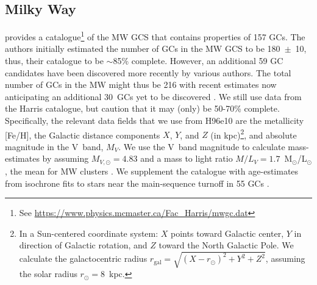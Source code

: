\documentclass[a4paper,fleqn,usenatbib]{mnras}
\begin{document}
\subsection{Milky Way}
\label{sec:milkyway}
\citet[][2010 edition; hereafter H96e10]{1996AJ....112.1487H} provides a
catalogue\footnote{See \url{https://www.physics.mcmaster.ca/Fac_Harris/mwgc.dat}}
of the MW GCS that contains properties of 157 GCs. 
The authors initially estimated the number of GCs in the MW GCS to be 180~$\pm$~10,
thus, their catalogue to be ${\sim}$85\% complete. However, an additional 59 GC
candidates have been discovered more recently by various authors. The total number of GCs
in the MW might thus be 216 with recent estimates now anticipating an additional 
$30$~GCs yet to be discovered \citep[e.g.][and references therein]{2018ApJ...863L..38R}.
We still use data from the Harris catalogue, but caution that it may (only) be
50-70\% complete. Specifically, the relevant data fields that we use from H96e10
are the metallicity [Fe/H], the Galactic distance components $X$, $Y$, and $Z$ (in
kpc)\footnote{In a Sun-centered coordinate system: $X$ points toward Galactic
center, $Y$ in direction of Galactic rotation, and $Z$ toward the North Galactic
Pole. We calculate the galactocentric radius $r_{\text{gal}}=\sqrt{(X-r_\odot)^2
+ Y^2 + Z^2}$, assuming the solar radius $r_\odot=8$~kpc.}, and absolute
magnitude in the V~band, $M_V$. We use the V~band magnitude to calculate 
mass-estimates by assuming $M_{V,\odot}=4.83$ and a mass to light ratio 
$M/L_V = 1.7$~M$_{\odot}$/L$_{\odot}$, the mean for MW clusters \citep{2005ApJS..161..304M}. 
We supplement the catalogue with age-estimates from isochrone fits to stars near 
the main-sequence turnoff in 55 GCs \citep[][hereafter V13]{2013ApJ...775..134V}.

\end{document}
